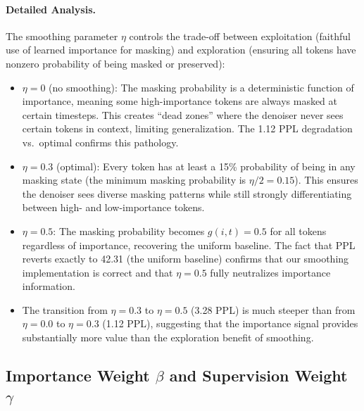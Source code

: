 \paragraph{Detailed Analysis.} The smoothing parameter $\eta$ controls the trade-off between exploitation (faithful use of learned importance for masking) and exploration (ensuring all tokens have nonzero probability of being masked or preserved):

\begin{itemize}[leftmargin=*,itemsep=2pt]
    \item \textbf{$\eta = 0$} (no smoothing): The masking probability is a deterministic function of importance, meaning some high-importance tokens are always masked at certain timesteps. This creates ``dead zones'' where the denoiser never sees certain tokens in context, limiting generalization. The 1.12 PPL degradation vs.\ optimal confirms this pathology.
    
    \item \textbf{$\eta = 0.3$} (optimal): Every token has at least a 15\% probability of being in any masking state (the minimum masking probability is $\eta/2 = 0.15$). This ensures the denoiser sees diverse masking patterns while still strongly differentiating between high- and low-importance tokens.
    
    \item \textbf{$\eta = 0.5$}: The masking probability becomes $g(i, t) = 0.5$ for all tokens regardless of importance, recovering the uniform baseline. The fact that PPL reverts exactly to 42.31 (the uniform baseline) confirms that our smoothing implementation is correct and that $\eta = 0.5$ fully neutralizes importance information.
    
    \item The transition from $\eta = 0.3$ to $\eta = 0.5$ (3.28 PPL) is much steeper than from $\eta = 0.0$ to $\eta = 0.3$ (1.12 PPL), suggesting that the importance signal provides substantially more value than the exploration benefit of smoothing.
\end{itemize}

\subsection{Importance Weight $\beta$ and Supervision Weight $\gamma$}

